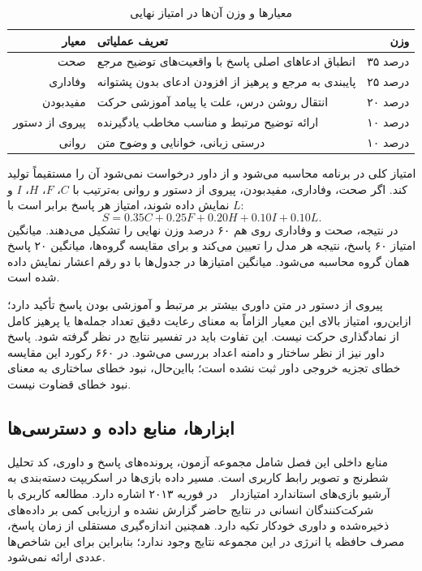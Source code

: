 \begin{table}[htbp]
\centering
\caption{معیارها و وزن آن‌ها در امتیاز نهایی}
\label{tab:criteria}
\begin{tabular}{rp{9cm}r}
\toprule
معیار & تعریف عملیاتی & وزن \\
\midrule
صحت & انطباق ادعاهای اصلی پاسخ با واقعیت‌های توضیح مرجع & ۳۵ درصد \\
وفاداری & پایبندی به مرجع و پرهیز از افزودن ادعای بدون پشتوانه & ۲۵ درصد \\
مفیدبودن & انتقال روشن درس، علت یا پیامد آموزشی حرکت & ۲۰ درصد \\
پیروی از دستور & ارائه توضیح مرتبط و مناسب مخاطب یادگیرنده & ۱۰ درصد \\
روانی & درستی زبانی، خوانایی و وضوح متن & ۱۰ درصد \\
\bottomrule
\end{tabular}
\end{table}

امتیاز کلی در برنامه محاسبه می‌شود و از داور درخواست نمی‌شود آن را مستقیماً تولید کند. اگر صحت، وفاداری، مفیدبودن، پیروی از دستور و روانی به‌ترتیب با $C$، $F$، $H$، $I$ و $L$ نمایش داده شوند، امتیاز هر پاسخ برابر است با:
\begin{equation}
S=0.35C+0.25F+0.20H+0.10I+0.10L.
\end{equation}
در نتیجه، صحت و وفاداری روی هم ۶۰ درصد وزن نهایی را تشکیل می‌دهند. میانگین امتیاز ۶۰ پاسخ، نتیجه هر مدل را تعیین می‌کند و برای مقایسه گروه‌ها، میانگین ۲۰ پاسخ همان گروه محاسبه می‌شود. میانگین امتیازها در جدول‌ها با دو رقم اعشار نمایش داده شده است.

پیروی از دستور در متن داوری بیشتر بر مرتبط و آموزشی بودن پاسخ تأکید دارد؛ ازاین‌رو، امتیاز بالای این معیار الزاماً به معنای رعایت دقیق تعداد جمله‌ها یا پرهیز کامل از نمادگذاری حرکت نیست. این تفاوت باید در تفسیر نتایج در نظر گرفته شود. پاسخ داور نیز از نظر ساختار و دامنه اعداد بررسی می‌شود. در ۶۶۰ رکورد این مقایسه خطای تجزیه خروجی داور ثبت نشده است؛ بااین‌حال، نبود خطای ساختاری به معنای نبود خطای قضاوت نیست.

\subsection{ابزارها، منابع داده و دسترسی‌ها}
منابع داخلی این فصل شامل مجموعه آزمون، پرونده‌های پاسخ و داوری، کد تحلیل شطرنج و تصویر رابط کاربری است. مسیر داده بازی‌ها در اسکریپت دسته‌بندی به آرشیو بازی‌های استاندارد امتیازدار ~\cite{lichess-data} در فوریه ۲۰۱۳ اشاره دارد. مطالعه کاربری با شرکت‌کنندگان انسانی در نتایج حاضر گزارش نشده و ارزیابی کمی بر داده‌های ذخیره‌شده و داوری خودکار تکیه دارد. همچنین اندازه‌گیری مستقلی از زمان پاسخ، مصرف حافظه یا انرژی در این مجموعه نتایج وجود ندارد؛ بنابراین برای این شاخص‌ها عددی ارائه نمی‌شود.

